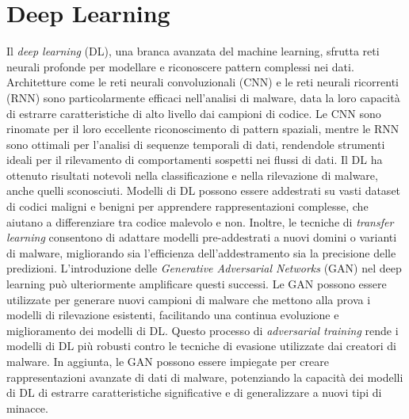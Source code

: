 \section{Deep Learning}
Il \emph{deep learning} (DL), una branca avanzata del machine learning, sfrutta reti neurali profonde per modellare e riconoscere pattern complessi nei dati. Architetture come le reti neurali convoluzionali (CNN) e le reti neurali ricorrenti (RNN) sono particolarmente efficaci nell'analisi di malware, data la loro capacità di estrarre caratteristiche di alto livello dai campioni di codice. Le CNN sono rinomate per il loro eccellente riconoscimento di pattern spaziali, mentre le RNN sono ottimali per l'analisi di sequenze temporali di dati, rendendole strumenti ideali per il rilevamento di comportamenti sospetti nei flussi di dati.
Il DL ha ottenuto risultati notevoli nella classificazione e nella rilevazione di malware, anche quelli sconosciuti. Modelli di DL possono essere addestrati su vasti dataset di codici maligni e benigni per apprendere rappresentazioni complesse, che aiutano a differenziare tra codice malevolo e non. Inoltre, le tecniche di \emph{transfer learning} consentono di adattare modelli pre-addestrati a nuovi domini o varianti di malware, migliorando sia l'efficienza dell'addestramento sia la precisione delle predizioni.
L'introduzione delle \emph{Generative Adversarial Networks} (GAN) nel deep learning può ulteriormente amplificare questi successi. Le GAN possono essere utilizzate per generare nuovi campioni di malware che mettono alla prova i modelli di rilevazione esistenti, facilitando una continua evoluzione e miglioramento dei modelli di DL. Questo processo di \emph{adversarial training} rende i modelli di DL più robusti contro le tecniche di evasione utilizzate dai creatori di malware. In aggiunta, le GAN possono essere impiegate per creare rappresentazioni avanzate di dati di malware, potenziando la capacità dei modelli di DL di estrarre caratteristiche significative e di generalizzare a nuovi tipi di minacce.

